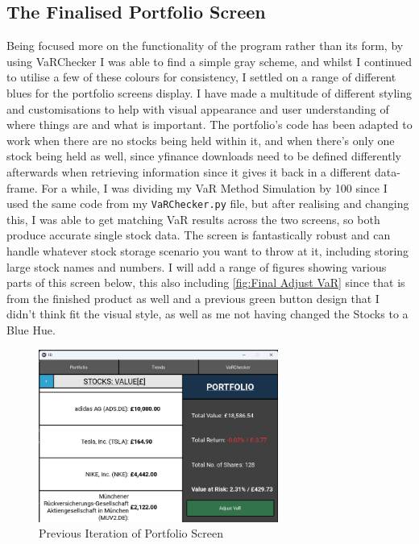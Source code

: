 \documentclass{article}
\begin{document}
\subsection{The Finalised Portfolio Screen}
Being focused more on the functionality of the program rather than its form, by using VaRChecker I was able to find a simple gray scheme, and whilst I continued to utilise a few of these colours for consistency, I settled on a range of different blues for the portfolio screens display. I have made a multitude of different styling and customisations to help with visual appearance and user understanding of where things are and what is important. The portfolio's code has been adapted to work when there are no stocks being held within it, and when there's only one stock being held as well, since yfinance downloads need to be defined differently afterwards when retrieving information since it gives it back in a different data-frame. For a while, I was dividing my VaR Method Simulation by 100 since I used the same code from my \texttt{VaRChecker.py} file, but after realising and changing this, I was able to get matching VaR results across the two screens, so both produce accurate single stock data. The screen is fantastically robust and can handle whatever stock storage scenario you want to throw at it, including storing large stock names and numbers. I will add a range of figures showing various parts of this screen below, this also including \ref{fig:Final Adjust VaR} since that is from the finished product as well and a previous green button design that I didn't think fit the visual style, as well as me not having changed the Stocks to a Blue Hue.\\\vspace{0.3cm}

\begin{figure}[h]
  \centering
  \includegraphics[width=0.7\textwidth]{Images/Term 2 Images/image (8).png}
  \caption{Previous Iteration of Portfolio Screen}
  \label{fig:Previous Iteration}
\end{figure}
\end{document}
